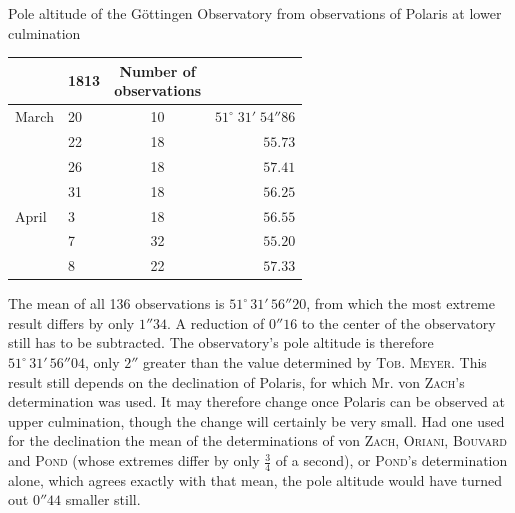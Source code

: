 \begin{center}Pole altitude of the Göttingen Observatory from observations of Polaris at lower culmination\end{center}
\begin{center}\fontsize{10}{12}\selectfont\setlength{\tabcolsep}{7pt}\renewcommand{\arraystretch}{1.15}\begin{tabular}{ll|c|r}
& 1813 & \shortstack{Number of\\observations} &\\\hline
March & 20 & 10 & $51^\circ\;31'\;54''86$\\
& 22 & 18 & $55.73$\\
& 26 & 18 & $57.41$\\
& 31 & 18 & $56.25$\\
April & 3 & 18 & $56.55$\\
& 7 & 32 & $55.20$\\
& 8 & 22 & $57.33$\\
\end{tabular}\end{center}

\par\indent{}The mean of all 136 observations is $51^\circ\,31'\,56''20$, from which the most extreme result differs by only $1''34$. A reduction of $0''16$ to the center of the observatory still has to be subtracted. The observatory’s pole altitude is therefore $51^\circ\,31'\,56''04$, only $2''$ greater than the value determined by \textsc{Tob. Meyer}. This result still depends on the declination of Polaris, for which Mr. von \textsc{Zach}’s determination was used. It may therefore change once Polaris can be observed at upper culmination, though the change will certainly be very small. Had one used for the declination the mean of the determinations of von \textsc{Zach}, \textsc{Oriani}, \textsc{Bouvard} and \textsc{Pond} (whose extremes differ by only $\frac{3}{4}$ of a second), or \textsc{Pond}’s determination alone, which agrees exactly with that mean, the pole altitude would have turned out $0''44$ smaller still.

